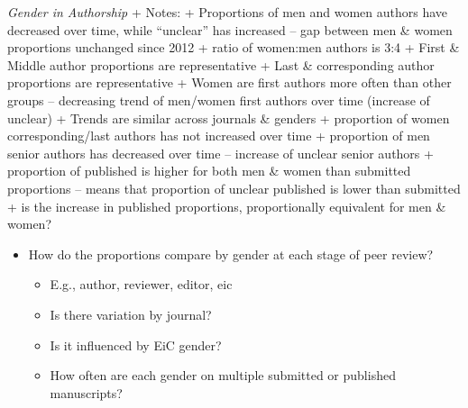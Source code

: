 \documentclass[11pt,]{article}
\providecommand{\tightlist}{%
  \setlength{\itemsep}{0pt}\setlength{\parskip}{0pt}}
\begin{document}
\emph{Gender in Authorship} + Notes: + Proportions of men and women
authors have decreased over time, while ``unclear'' has increased -- gap
between men \& women proportions unchanged since 2012 + ratio of
women:men authors is 3:4 + First \& Middle author proportions are
representative + Last \& corresponding author proportions are
representative + Women are first authors more often than other groups --
decreasing trend of men/women first authors over time (increase of
unclear) + Trends are similar across journals \& genders + proportion of
women corresponding/last authors has not increased over time +
proportion of men senior authors has decreased over time -- increase of
unclear senior authors + proportion of published is higher for both men
\& women than submitted proportions -- means that proportion of unclear
published is lower than submitted + is the increase in published
proportions, proportionally equivalent for men \& women?

\begin{itemize}
\tightlist
\item
  How do the proportions compare by gender at each stage of peer review?

  \begin{itemize}
  \tightlist
  \item
    E.g., author, reviewer, editor, eic
  \item
    Is there variation by journal?
  \item
    Is it influenced by EiC gender?
  \item
    How often are each gender on multiple submitted or published
    manuscripts?
  \end{itemize}
\end{itemize}
\end{document}
